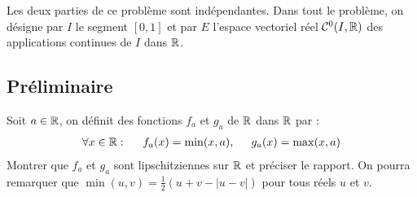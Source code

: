 Les deux parties de ce problème sont indépendantes. Dans tout le problème, on désigne par $I$ le segment $[0,1]$ et par $E$ l'espace vectoriel réel $\mathcal{C}^0(I,\mathbb{R})$ des applications continues de $I$ dans $\mathbb{R}$.

\subsection*{Préliminaire}
Soit $a\in \mathbb{R}$, on définit des fonctions $f_a$ et $g_a$ de $\mathbb{R}$ dans $\mathbb{R}$ par :
\begin{align*}
 \forall x \in \mathbb{R}:\hspace{0.5cm} f_a(x)= \min (x,a),\hspace{0.5cm} g_a(x)= \max (x,a)
\end{align*}
Montrer que $f_a$ et $g_a$ sont lipschitziennes sur $\mathbb{R}$ et préciser le rapport.\newline
On pourra remarquer que $\min (u,v)=\frac{1}{2}(u+v-|u-v|)$ pour tous réels $u$ et $v$.

